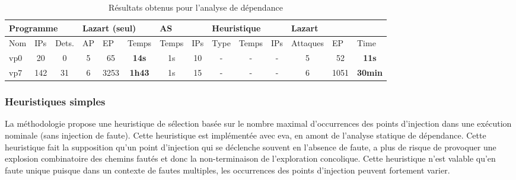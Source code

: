                 \begin{table}[!htpb]
                    \scriptsize
                        \caption{Résultats obtenus pour l'analyse de dépendance}\label{tbl:results-fdep}
                    \begin{center}
                        \setlength\tabcolsep{4pt}
                        \begin{tabular}{l|c|c|c|c|c|c|c|c|c|c|c|c|c}
                        \multicolumn{3}{l|}{Programme} & \multicolumn{3}{l|}{Lazart (seul)} & \multicolumn{2}{l|}{AS} & \multicolumn{3}{l|}{Heuristique} & \multicolumn{3}{l}{Lazart} \\
                        \hline
                        \multicolumn{1}{l|}{Nom} & \multicolumn{1}{l}{IPs} & \multicolumn{1}{l|}{Dets.} & \multicolumn{1}{l|}{AP} & \multicolumn{1}{l|}{EP} & \multicolumn{1}{l|}{Temps} & \multicolumn{1}{l|}{Temps} & \multicolumn{1}{l|}{IPs} & \multicolumn{1}{l|}{Type} & \multicolumn{1}{l|}{Temps} & \multicolumn{1}{l|}{IPs} & \multicolumn{1}{l|}{Attaques} & \multicolumn{1}{l|}{EP} & \multicolumn{1}{l}{Time} \\
                        \hline
                        \hline
                        \multicolumn{1}{l}{vp0} & 20 & 0 & 5 & 65 & \textbf{14s} & 1s & 10 & - & - & - & 5 & 52 & \textbf{11s} \\
                        \multicolumn{1}{l}{vp7} & 142 & 31 & 6 & 3253 & \textbf{1h43} & 1s & 15 & - & - & - & 6 & 1051 & \textbf{30min}
                        \end{tabular}
                    \end{center}
                \end{table} 
                 
            \subsubsection{Heuristiques simples}
            \label{sec:lazart:metho:static}
            
                La méthodologie \cite{lacombe2023combining} propose une heuristique de sélection basée sur le nombre maximal d'occurrences des points d'injection dans une exécution nominale (sans injection de faute).
                Cette heuristique est implémentée avec \gls{eva}, en amont de l'analyse statique de dépendance.
                Cette heuristique fait la supposition qu'un point d'injection qui se déclenche souvent en l'absence de faute, a plus de risque de provoquer une explosion combinatoire des chemins fautés et donc la non-terminaison de l'exploration concolique. 
                Cette heuristique n'est valable qu'en faute unique puisque dans un contexte de fautes multiples, les occurrences des points d'injection peuvent fortement varier.
                
